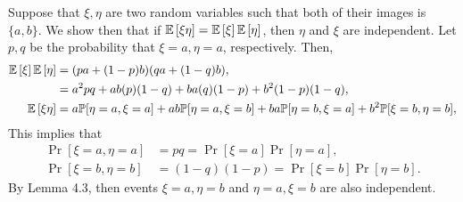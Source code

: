 \begin{solution}
    Suppose that $\xi,\eta$ are two random variables such that both of their images is $\{a,b\}$. We show then that if $\mathbb{E}\left[\xi\eta\right] = \mathbb{E}\left[\xi\right]\mathbb{E}\left[\eta\right]$, then $\eta$ and $\xi$ are independent. Let $p,q$ be the probability that $\xi = a,\eta=a$, respectively. Then, 
    \begin{align*}
        \mathbb{E}\left[\xi\right]\mathbb{E}\left[\eta\right] &= (pa + (1-p)b)(qa + (1-q)b), \\
        &= a^2pq + ab(p)(1-q) + ba(q)(1-p) + b^2(1-p)(1-q), \\
        \mathbb{E}\left[\xi\eta\right] &= a\mathbb{P}[\eta=a,\xi=a] + ab\mathbb{P}[\eta=a,\xi=b] + ba\mathbb{P}[\eta=b,\xi=a] + b^2\mathbb{P}[\xi=b,\eta=b],
    \end{align*}
    This implies that 
    \begin{align*}
        \Pr[\xi=a,\eta=a] &= pq = \Pr[\xi=a]\Pr[\eta=a], \\
        \Pr[\xi=b,\eta=b] &= (1-q)(1-p) = \Pr[\xi=b]\Pr[\eta=b].
    \end{align*}
    By Lemma 4.3, then events $\xi = a, \eta = b$ and $\eta=a,\xi=b$ are also independent. 
\end{solution}
\begin{problem}{5}
\end{problem}
\begin{solution}
    
\end{solution}
\begin{problem}{6}
\end{problem}
\begin{solution}
    
\end{solution}
\begin{problem}{7}

\end{problem}
\begin{solution}
    
\end{solution}